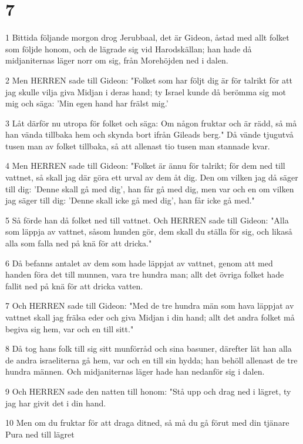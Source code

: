 \chapter{7}

\par 1 Bittida följande morgon drog Jerubbaal, det är Gideon, åstad med allt folket som följde honom, och de lägrade sig vid Harodskällan; han hade då midjaniternas läger norr om sig, från Morehöjden ned i dalen.
\par 2 Men HERREN sade till Gideon: "Folket som har följt dig är för talrikt för att jag skulle vilja giva Midjan i deras hand; ty Israel kunde då berömma sig mot mig och säga: 'Min egen hand har frälst mig.'
\par 3 Låt därför nu utropa för folket och säga: Om någon fruktar och är rädd, så må han vända tillbaka hem och skynda bort ifrån Gileads berg." Då vände tjugutvå tusen man av folket tillbaka, så att allenast tio tusen man stannade kvar.
\par 4 Men HERREN sade till Gideon: "Folket är ännu för talrikt; för dem ned till vattnet, så skall jag där göra ett urval av dem åt dig. Den om vilken jag då säger till dig: 'Denne skall gå med dig', han får gå med dig, men var och en om vilken jag säger till dig: 'Denne skall icke gå med dig', han får icke gå med."
\par 5 Så förde han då folket ned till vattnet. Och HERREN sade till Gideon: "Alla som läppja av vattnet, såsom hunden gör, dem skall du ställa för sig, och likaså alla som falla ned på knä för att dricka."
\par 6 Då befanns antalet av dem som hade läppjat av vattnet, genom att med handen föra det till munnen, vara tre hundra man; allt det övriga folket hade fallit ned på knä för att dricka vatten.
\par 7 Och HERREN sade till Gideon: "Med de tre hundra män som hava läppjat av vattnet skall jag frälsa eder och giva Midjan i din hand; allt det andra folket må begiva sig hem, var och en till sitt."
\par 8 Då tog hans folk till sig sitt munförråd och sina basuner, därefter lät han alla de andra israeliterna gå hem, var och en till sin hydda; han behöll allenast de tre hundra männen. Och midjaniternas läger hade han nedanför sig i dalen.
\par 9 Och HERREN sade den natten till honom: "Stå upp och drag ned i lägret, ty jag har givit det i din hand.
\par 10 Men om du fruktar för att draga ditned, så må du gå förut med din tjänare Pura ned till lägret
